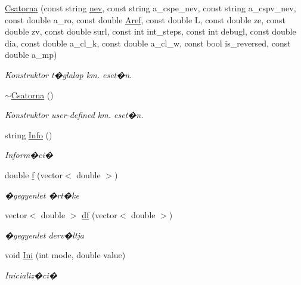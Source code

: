 \begin{DoxyCompactItemize}
\item 
\hyperlink{class_csatorna_ae3829a74761e0507363290fde29af12b}{Csatorna} (const string \hyperlink{class_agelem_abe92b7e3912367d5d1caf6b277ca0b7d}{nev}, const string a\+\_\+cspe\+\_\+nev, const string a\+\_\+cspv\+\_\+nev, const double a\+\_\+ro, const double \hyperlink{class_agelem_a3f8668febc2958fd539997d537552f17}{Aref}, const double L, const double ze, const double zv, const double surl, const int int\+\_\+steps, const int debugl, const double dia, const double a\+\_\+cl\+\_\+k, const double a\+\_\+cl\+\_\+w, const bool is\+\_\+reversed, const double a\+\_\+mp)
\begin{DoxyCompactList}\small\item\em Konstruktor t�glalap km. eset�n. \end{DoxyCompactList}\item 
\hyperlink{class_csatorna_a84452f3df42df853e0600d383cd37d8a}{$\sim$\+Csatorna} ()
\begin{DoxyCompactList}\small\item\em Konstruktor user-\/defined km. eset�n. \end{DoxyCompactList}\item 
string \hyperlink{class_csatorna_a77f24ff76c738a89cb827d251fec0845}{Info} ()
\begin{DoxyCompactList}\small\item\em Inform�ci� \end{DoxyCompactList}\item 
double \hyperlink{class_csatorna_a5cd4e0975717ce0baab89f57a566782a}{f} (vector$<$ double $>$)
\begin{DoxyCompactList}\small\item\em �gegyenlet �rt�ke \end{DoxyCompactList}\item 
vector$<$ double $>$ \hyperlink{class_csatorna_a5330dbbbc669f49382c822ffcc671d16}{df} (vector$<$ double $>$)
\begin{DoxyCompactList}\small\item\em �gegyenlet derv�ltja \end{DoxyCompactList}\item 
void \hyperlink{class_csatorna_ab30adea649ae8708061e211dc450cb06}{Ini} (int mode, double value)
\begin{DoxyCompactList}\small\item\em Inicializ�ci� \end{DoxyCompactList}\item 

\end{DoxyCompactItemize}
